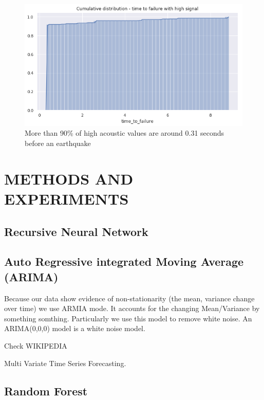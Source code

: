 \documentclass[]{llncs}
\begin{document}
\begin{figure}
	\centering
	\includegraphics[width=0.7\linewidth]{../GPUProject/moreThan90percent}
	\caption{More than 90\% of high acoustic values are around 0.31 seconds before an earthquake}
		\label{fig:morethan90percent}
	\end{figure}






\section{METHODS AND EXPERIMENTS}

\subsection{Recursive Neural Network}
\subsection{Auto Regressive integrated Moving Average (ARIMA)}
Because our data show evidence of non-stationarity (the mean, variance change over time) we use ARMIA mode. It accounts for the changing Mean/Variance by something somthing.
Particularly we use this model to remove white noise. An ARIMA(0,0,0) model is a white noise model.

Check WIKIPEDIA

Multi Variate Time Series Forecasting.





\subsection{Random Forest}




\end{document}
